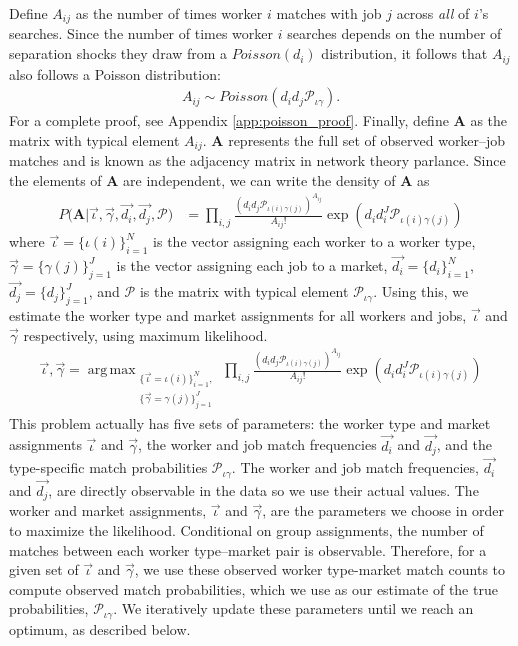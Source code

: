 \documentclass[12pt]{article}
\def\ig{\iota\gamma}
\def\g{\gamma}
\def\i{\iota}
\DeclareMathOperator*{\argmax}{arg\,max}
\theoremstyle{definition}
\theoremstyle{plain}
\begin{document}
Define $A_{ij}$ as the number of times worker $i$ matches with job $j$ across \emph{all} of $i$'s searches. Since the number of times worker $i$ searches depends on the number of separation shocks they draw from a $Poisson(d_i)$ distribution, it follows that $A_{ij}$ also follows a Poisson distribution:
\begin{align}
 A_{ij} \sim  Poisson \left( d_i d_j \mathcal{P}_{\ig}  \right).
\end{align}
For a complete proof, see Appendix \ref{app:poisson_proof}. Finally, define $\mathbf{A}$ as the matrix with typical element $A_{ij}$. $\mathbf{A}$ represents the full set of observed worker--job matches and is known as the adjacency matrix in network theory parlance. Since the elements of $\mathbf{A}$ are independent, we can write the density of $\mathbf{A}$ as 
\begin{align} 
P \bigg(\mathbf{A} \bigg|\vec{\i}, \vec{\g}, \vec{d_i}, \vec{d_j} , \mathbf{\mathcal{P}} \bigg)  
&= \prod_{ i,j } \frac{\left(d_i d_j \mathcal{P}_{\i(i)\g(j)}\right)^{A_{ij}}}{A_{ij}!} \exp \left(d_i d_i^J \mathcal{P}_{\i(i)\g(j)} \right)  \label{eq:BiSBM}
\end{align} 
where $\vec{\i} = \{\i(i)\}_{i=1}^N$ is the vector assigning each worker to a worker type, $\vec{\g} = \{\g(j)\}_{j=1}^J$ is the vector assigning each job to a market, $\vec{d_i} = \{d_i\}_{i=1}^N$, $\vec{d_j} = \{d_j\}_{j=1}^J$,  and $\mathbf{\mathcal{P}}$ is the matrix with typical element $\mathcal{P}_{\i\g}$. Using this, we estimate the worker type and market assignments for all workers and jobs, $\vec{\i}$ and $\vec{\g}$ respectively, using maximum likelihood.
\begin{align}
\vec{\i},\vec{\g} = \argmax_{\begin{matrix} \{\vec{\i}=\i(i)\}_{i=1}^N, \\ \{\vec{\g}=\g(j)\}_{j=1}^J \end{matrix}}  \prod_{ i,j } \frac{\left(d_i d_j  \mathcal{P}_{\i(i)\g(j)}\right)^{A_{ij}}}{A_{ij}!} \exp \left(d_i d_i^J  \mathcal{P}_{\i(i)\g(j)}\right) \label{eq:BiSBM_max_likelihood}
\end{align}
This problem actually has five sets of parameters: the worker type and market assignments $\vec{\i}$ and $\vec{\g}$, the worker and job match frequencies $\vec{d_i}$ and $\vec{d_j}$, and the type-specific match probabilities $\mathcal{P}_{\ig}$. The worker and job match frequencies, $\vec{d_i}$ and $\vec{d_j}$, are directly observable in the data so we use their actual values. The worker and market assignments, $\vec{\i}$ and $\vec{\g}$, are the parameters we choose in order to maximize the likelihood. Conditional on group assignments, the number of matches between each worker type--market pair is observable. Therefore, for a given set of $\vec{\i}$ and $\vec{\g}$, we use these observed worker type-market match counts to compute observed match probabilities, which we use as our estimate of the true probabilities, $\mathcal{P}_{\ig}$. We iteratively update these parameters until we reach an optimum, as described below.  
\end{document}

